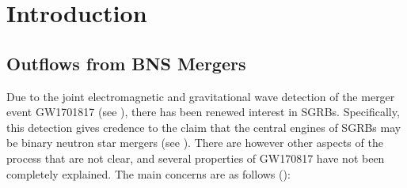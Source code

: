 \chapter{Introduction}\label{ch:introduction}

\section{Outflows from BNS Mergers}\label{sec:bns}
    Due to the joint electromagnetic and gravitational wave detection of the merger
    event GW1701817 (see \cite{abbott_2018}), there has been renewed interest in SGRBs.
    Specifically, this detection gives credence to the claim that the central engines of
    SGRBs may be binary neutron star mergers (see \cite{narayan_1992}). There are
    however other aspects of the process that are not clear, and several properties of
    GW170817 have not been completely explained. The main concerns are as follows
    (\cite{lazzati_2020}):

